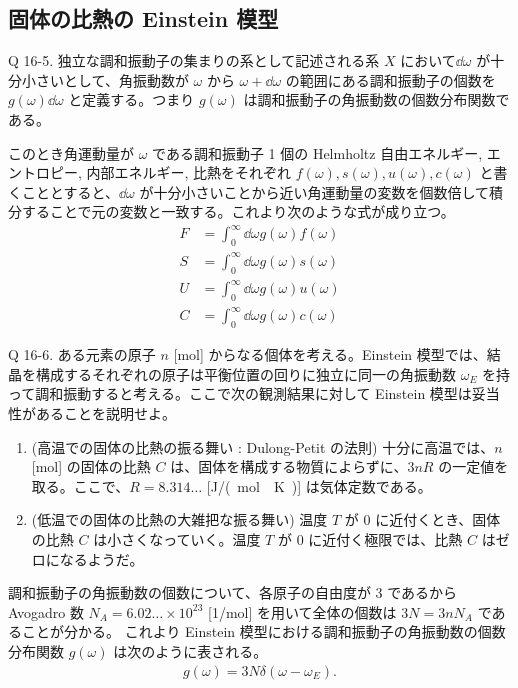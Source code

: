 \documentclass[uplatex,dvipdfmx,a4paper,11pt]{jlreq}
\theoremstyle{definition}
\begin{document}
\subsection{固体の比熱の Einstein 模型}
\begin{itembox}[l]{Q 16-5.}
  独立な調和振動子の集まりの系として記述される系 $X$ において$\dd{\omega}$ が十分小さいとして、角振動数が $\omega$ から $\omega + \dd{\omega}$ の範囲にある調和振動子の個数を $g(\omega)\dd{\omega}$ と定義する。つまり $g(\omega)$ は調和振動子の角振動数の個数分布関数である。
\end{itembox}
このとき角運動量が $\omega$ である調和振動子 1 個の Helmholtz 自由エネルギー, エントロピー, 内部エネルギー, 比熱をそれぞれ $f(\omega), s(\omega), u(\omega), c(\omega)$ と書くこととすると、$\dd{\omega}$ が十分小さいことから近い角運動量の変数を個数倍して積分することで元の変数と一致する。これより次のような式が成り立つ。
\begin{align}
  F & = \int_0^\infty\dd{\omega}g(\omega)f(\omega) \\
  S & = \int_0^\infty\dd{\omega}g(\omega)s(\omega) \\
  U & = \int_0^\infty\dd{\omega}g(\omega)u(\omega) \\
  C & = \int_0^\infty\dd{\omega}g(\omega)c(\omega)
\end{align}

\begin{itembox}[l]{Q 16-6.}
  ある元素の原子 $n$ [\si{mol}] からなる個体を考える。Einstein 模型では、結晶を構成するそれぞれの原子は平衡位置の回りに独立に同一の角振動数 $\omega_E$ を持って調和振動すると考える。ここで次の観測結果に対して Einstein 模型は妥当性があることを説明せよ。
  \begin{enumerate}
    \item (高温での固体の比熱の振る舞い : Dulong-Petit の法則) 十分に高温では、$n$ [\si{mol}] の固体の比熱 $C$ は、固体を構成する物質によらずに、$3nR$ の一定値を取る。ここで、$R = 8.314\ldots$ [\si{J/(mol\cdot K)}] は気体定数である。
    \item (低温での固体の比熱の大雑把な振る舞い) 温度 $T$ が $0$ に近付くとき、固体の比熱 $C$ は小さくなっていく。温度 $T$ が $0$ に近付く極限では、比熱 $C$ はゼロになるようだ。
  \end{enumerate}
\end{itembox}
調和振動子の角振動数の個数について、各原子の自由度が $3$ であるから Avogadro 数 $N_A = 6.02\ldots\times 10^{23}$ [\si{1/mol}] を用いて全体の個数は $3N = 3nN_A$ であることが分かる。
これより Einstein 模型における調和振動子の角振動数の個数分布関数 $g(\omega)$ は次のように表される。
\begin{align}
  g(\omega) = 3N\delta(\omega - \omega_E).
\end{align}
\end{document}
